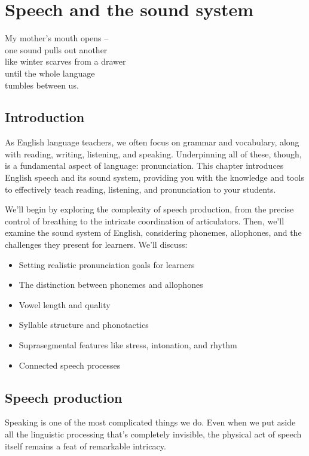 \chapter{Speech and the sound system}\label{ch:sound}

\epigraph{My mother's mouth opens --\\
one sound pulls out another\\
like winter scarves from a drawer\\
until the whole language\\
tumbles between us.}{}

\section{Introduction}

As English language teachers, we often focus on grammar and vocabulary, along with reading, writing, listening, and speaking. Underpinning all of these, though, is a fundamental aspect of language: pronunciation. This chapter introduces English speech and its sound system, providing you with the knowledge and tools to effectively teach reading, listening, and pronunciation to your students.

We'll begin by exploring the complexity of speech production, from the precise control of breathing to the intricate coordination of articulators. Then, we'll examine the sound system of English, considering phonemes, allophones, and the challenges they present for learners. We'll discuss:

\begin{itemize}[noitemsep]
    \item Setting realistic pronunciation goals for learners
    \item The distinction between phonemes and allophones
    \item Vowel length and quality
    \item Syllable structure and phonotactics
    \item Suprasegmental features like stress, intonation, and rhythm
    \item Connected speech processes
\end{itemize}

\section{Speech production}
Speaking is one of the most complicated things we do. Even when we put aside all the linguistic processing that's completely invisible, the physical act of speech itself remains a feat of remarkable intricacy.

